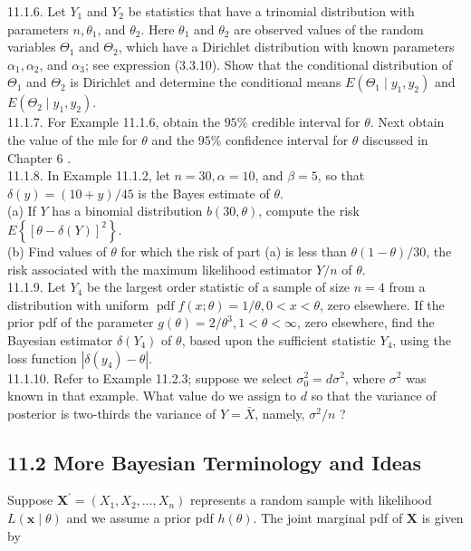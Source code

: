 11.1.6. Let $Y_{1}$ and $Y_{2}$ be statistics that have a trinomial distribution with parameters $n, \theta_{1}$, and $\theta_{2}$. Here $\theta_{1}$ and $\theta_{2}$ are observed values of the random variables $\Theta_{1}$ and $\Theta_{2}$, which have a Dirichlet distribution with known parameters $\alpha_{1}, \alpha_{2}$, and $\alpha_{3}$; see expression (3.3.10). Show that the conditional distribution of $\Theta_{1}$ and $\Theta_{2}$ is Dirichlet and determine the conditional means $E\left(\Theta_{1} \mid y_{1}, y_{2}\right)$ and $E\left(\Theta_{2} \mid y_{1}, y_{2}\right)$.\\
11.1.7. For Example 11.1.6, obtain the $95 \%$ credible interval for $\theta$. Next obtain the value of the mle for $\theta$ and the $95 \%$ confidence interval for $\theta$ discussed in Chapter 6 .\\
11.1.8. In Example 11.1.2, let $n=30, \alpha=10$, and $\beta=5$, so that $\delta(y)=(10+y) / 45$ is the Bayes estimate of $\theta$.\\
(a) If $Y$ has a binomial distribution $b(30, \theta)$, compute the risk $E\left\{[\theta-\delta(Y)]^{2}\right\}$.\\
(b) Find values of $\theta$ for which the risk of part (a) is less than $\theta(1-\theta) / 30$, the risk associated with the maximum likelihood estimator $Y / n$ of $\theta$.\\
11.1.9. Let $Y_{4}$ be the largest order statistic of a sample of size $n=4$ from a distribution with uniform $\operatorname{pdf} f(x ; \theta)=1 / \theta, 0<x<\theta$, zero elsewhere. If the prior pdf of the parameter $g(\theta)=2 / \theta^{3}, 1<\theta<\infty$, zero elsewhere, find the Bayesian estimator $\delta\left(Y_{4}\right)$ of $\theta$, based upon the sufficient statistic $Y_{4}$, using the loss function $\left|\delta\left(y_{4}\right)-\theta\right|$.\\
11.1.10. Refer to Example 11.2.3; suppose we select $\sigma_{0}^{2}=d \sigma^{2}$, where $\sigma^{2}$ was known in that example. What value do we assign to $d$ so that the variance of posterior is two-thirds the variance of $Y=\bar{X}$, namely, $\sigma^{2} / n$ ?

\subsection*{11.2 More Bayesian Terminology and Ideas}
Suppose $\mathbf{X}^{\prime}=\left(X_{1}, X_{2}, \ldots, X_{n}\right)$ represents a random sample with likelihood $L(\mathbf{x} \mid \theta)$ and we assume a prior pdf $h(\theta)$. The joint marginal pdf of $\mathbf{X}$ is given by

